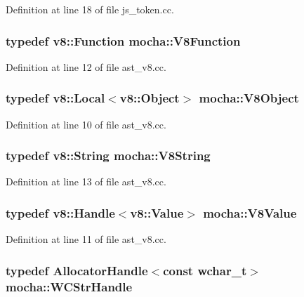Definition at line 18 of file js\_\-token.cc.

\hypertarget{namespacemocha_a6ba45e16246aba54ff2cd64ca991e089}{
\subsubsection[{V8Function}]{\setlength{\rightskip}{0pt plus 5cm}typedef v8::Function {\bf mocha::V8Function}}}
\label{namespacemocha_a6ba45e16246aba54ff2cd64ca991e089}


Definition at line 12 of file ast\_\-v8.cc.

\hypertarget{namespacemocha_ab7457ad2b98f5878f68f21f2c916ffb9}{
\subsubsection[{V8Object}]{\setlength{\rightskip}{0pt plus 5cm}typedef v8::Local$<$v8::Object$>$ {\bf mocha::V8Object}}}
\label{namespacemocha_ab7457ad2b98f5878f68f21f2c916ffb9}


Definition at line 10 of file ast\_\-v8.cc.

\hypertarget{namespacemocha_a04d2fb2a4ea8d21353a943ebf4263970}{
\subsubsection[{V8String}]{\setlength{\rightskip}{0pt plus 5cm}typedef v8::String {\bf mocha::V8String}}}
\label{namespacemocha_a04d2fb2a4ea8d21353a943ebf4263970}


Definition at line 13 of file ast\_\-v8.cc.

\hypertarget{namespacemocha_a22eca0d76f439fca2a26cae77eb6ade4}{
\subsubsection[{V8Value}]{\setlength{\rightskip}{0pt plus 5cm}typedef v8::Handle$<$v8::Value$>$ {\bf mocha::V8Value}}}
\label{namespacemocha_a22eca0d76f439fca2a26cae77eb6ade4}


Definition at line 11 of file ast\_\-v8.cc.

\hypertarget{namespacemocha_adf9965cefc9c7bcef4d9e7c979068061}{
\subsubsection[{WCStrHandle}]{\setlength{\rightskip}{0pt plus 5cm}typedef {\bf AllocatorHandle}$<$const wchar\_\-t$>$ {\bf mocha::WCStrHandle}}}
\label{namespacemocha_adf9965cefc9c7bcef4d9e7c979068061}


